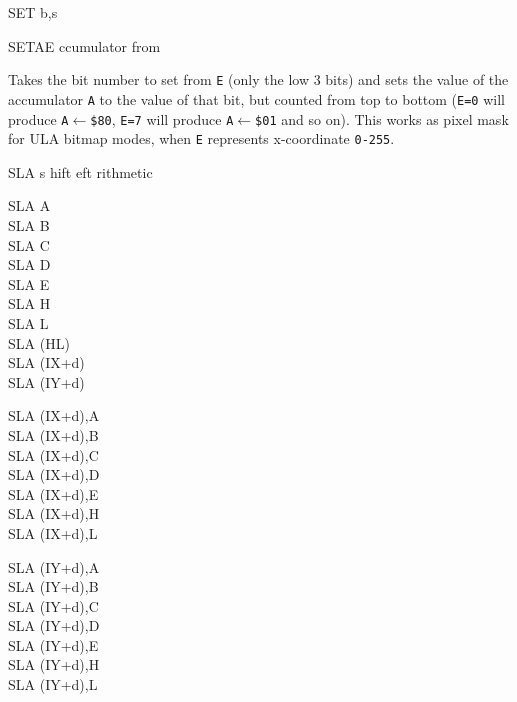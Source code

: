 \documentclass[12pt,twoside,openright,a4paper]{book}
\begin{document}
\begin{basedescript}{
	\desclabelstyle{\multilinelabel}
	\desclabelwidth{3cm}}
\begin{DetailItem}{SET b,s}
	\end{DetailItem}

	\begin{DetailItem}{SETAE\ZXN}
		{ ccumulator from }
		{\SymSETAE}

		Takes the bit number to set from {\tt E} (only the low 3 bits) and sets the value of the accumulator {\tt A} to the value of that bit, but counted from top to bottom ({\tt E=0} will produce {\tt A$\leftarrow$\$80}, {\tt E=7} will produce {\tt A$\leftarrow$\$01} and so on). This works as pixel mask for ULA bitmap modes, when {\tt E} represents x-coordinate {\tt 0-255}.

		\begin{DetailEffects}
			\FlagsSETAE
		\end{DetailEffects}
						
		\begin{DetailTiming}
		\end{DetailTiming}

	\end{DetailItem}

	\pagebreak
	\begin{DetailItem}{SLA s}
		{hift eft rithmetic}
		{}
		
		\begin{DetailVariants}
			SLA A\\
			SLA B\\
			SLA C\\
			SLA D\\
			SLA E\\
			SLA H\\
			SLA L\\
			SLA (HL)\\
			SLA (IX+d)\\
			SLA (IY+d)

			\columnbreak
			SLA (IX+d),A\UNDOC\\
			SLA (IX+d),B\UNDOC\\
			SLA (IX+d),C\UNDOC\\
			SLA (IX+d),D\UNDOC\\
			SLA (IX+d),E\UNDOC\\
			SLA (IX+d),H\UNDOC\\
			SLA (IX+d),L\UNDOC

			\columnbreak
			SLA (IY+d),A\UNDOC\\
			SLA (IY+d),B\UNDOC\\
			SLA (IY+d),C\UNDOC\\
			SLA (IY+d),D\UNDOC\\
			SLA (IY+d),E\UNDOC\\
			SLA (IY+d),H\UNDOC\\
			SLA (IY+d),L\UNDOC
		\end{DetailVariants}


\end{DetailItem}
\end{basedescript}
\end{document}
